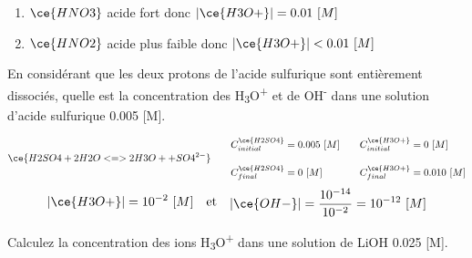 \documentclass[
  11pt,
  a4paper,
  openany]{book}
\providecommand{\tightlist}{%
  \setlength{\itemsep}{0pt}\setlength{\parskip}{0pt}}
\begin{document}
\begin{Answer}

\begin{enumerate}
\def\labelenumi{\alph{enumi}.}
\tightlist
\item
  \(\ce{HNO3}\) acide fort donc \(|\ce{H3O+}| = 0.01\ [M]\)
  \vspace{1em}
\item
  \(\ce{HNO2}\) acide plus faible donc \(|\ce{H3O+}| < 0.01\ [M]\)
  \vspace{1em}
\end{enumerate}

\end{Answer}

\clearpage

\begin{Exercise}
En considérant que les deux protons de l'acide sulfurique sont entièrement dissociés, quelle est la concentration des H\textsubscript{3}O\textsuperscript{+} et de OH\textsuperscript{-} dans une solution d'acide sulfurique 0.005 {[}M{]}.

\end{Exercise}

\begin{Answer}
\[
\begin{split}
\ce{H2SO4 + 2 H2O <=> 2 H3O+ + SO4^{2-}}
\end{split}
\qquad
\begin{split}
C_{initial}^{\ce{H2SO4}} &= 0.005\ [M] \\[1em]
C_{final}^{\ce{H2SO4}} &= 0\ [M]
\end{split}
\qquad
\begin{split}
C_{initial}^{\ce{H3O+}} &= 0\ [M] \\[1em]
C_{final}^{\ce{H3O+}} &= 0.010\ [M]
\end{split}
\]
\[
\begin{split}
|\ce{H3O+}| = 10^{-2}\ [M]
\end{split}
\quad \text{et} \quad
\begin{split}
|\ce{OH-}| = \frac{10^{-14}}{10^{-2}} = 10^{-12}\ [M]
\end{split}
\]

\end{Answer}

\begin{Exercise}
Calculez la concentration des ions H\textsubscript{3}O\textsuperscript{+} dans une solution de LiOH 0.025 {[}M{]}.

\end{Exercise}
\end{document}
